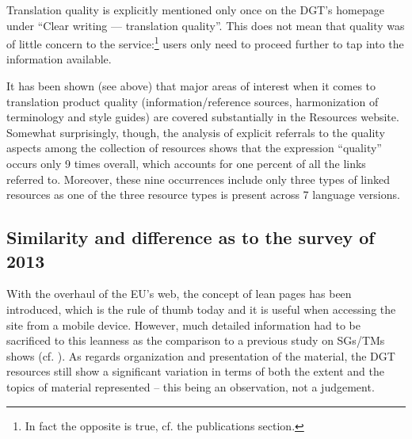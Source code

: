\documentclass[output=paper]{langsci/langscibook}
\begin{document}
Translation quality is explicitly mentioned only once on the DGT’s homepage under “Clear writing — translation quality”. This does not mean that quality was of little concern to the service:\footnote{In fact the opposite is true, cf. the publications section.} users only need to proceed further to tap into the information available.

It has been shown (see above) that major areas of interest when it comes to translation product quality (information/reference sources, harmonization of terminology and style guides) are covered substantially in the Resources website. Somewhat surprisingly, though, the analysis of explicit referrals to the quality aspects among the collection of resources shows that the expression “quality” occurs only 9 times overall, which accounts for one percent of all the links referred to. Moreover, these nine occurrences include only three types of linked resources as one of the three resource types is present across 7 language versions.

\subsection{Similarity and difference as to the survey of 2013}\label{sec:svoboda:5.3}

With the overhaul of the EU’s web, the concept of lean pages has been introduced, which is the rule of thumb today and it is useful when accessing the site from a mobile device. However, much detailed information had to be sacrificed to this leanness as the comparison to a previous study on SGs/TMs shows (cf. \citealt{Svoboda2013}). As regards organization and presentation of the material, the DGT resources still show a significant variation in terms of both the extent and the topics of material represented – this being an observation, not a judgement.
\end{document}
